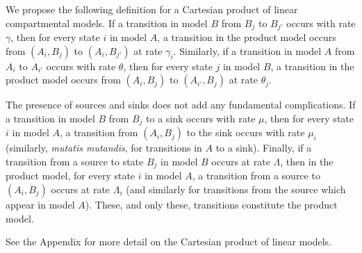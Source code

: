 \documentclass[review]{elsarticle}
\begin{document}
We propose the following definition for a Cartesian product of linear compartmental models.
If a transition in model $B$ from $B_j$ to $B_{j'}$ occurs with rate $\gamma$, then for every
state $i$ in model $A$, a transition in the product model occurs from
$(A_i,B_j)$ to $(A_i,B_{j'})$ at rate $\gamma_i$.  Similarly,
if a transition in model $A$ from $A_i$ to $A_{i'}$ occurs with rate $\theta$, then for every
state $j$ in model $B$, a transition in the product model occurs from
$(A_i,B_j)$ to $(A_{i'},B_j)$ at rate $\theta_j$.  

The presence of sources and sinks does not add any fundamental complications.
If a transition in model $B$ from $B_j$ to a sink occurs with rate $\mu$, then for every state $i$ in model $A$,
a transition from $(A_i,B_j)$ to the sink occurs with rate $\mu_i$ (similarly, {\it mutatis mutandis}, for
transitions in $A$ to a sink).
Finally, if a transition from a source to state $B_j$ in model $B$ occurs at rate $\Lambda$, then in the product model,
for every state $i$ in model $A$, a transition from a source to $(A_i,B_j)$ occurs at rate $\Lambda_i$ (and
similarly for transitions from the source which appear in model $A$).  These, and only these, transitions constitute
the product model.  

See the Appendix for more detail on the
Cartesian product of linear models.

\end{document}
